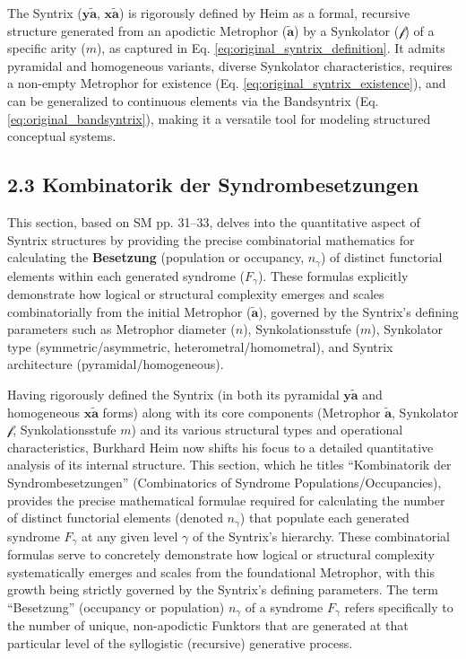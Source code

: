 \documentclass[12pt]{article}
\newcommand{\q}[1]{\enquote{#1}}
\newcommand{\syntrix}{\bm{y\widetilde{a}}}
\newcommand{\homogeneoussyntrix}{\bm{x\widetilde{a}}}
\newcommand{\metrophor}{\bm{\widetilde{a}}}
\newcommand{\synkolator}{\mathcal{f}}
\newcommand{\synkolationsstufe}{m}
\newcommand{\syndrom}{F} %
\begin{document}
The Syntrix (\(\syntrix\), \(\homogeneoussyntrix\)) is rigorously defined by Heim as a formal, recursive structure generated from an apodictic Metrophor (\(\metrophor\)) by a Synkolator (\(\synkolator\)) of a specific arity (\(\synkolationsstufe\)), as captured in Eq. \eqref{eq:original_syntrix_definition}. It admits pyramidal and homogeneous variants, diverse Synkolator characteristics, requires a non-empty Metrophor for existence (Eq. \eqref{eq:original_syntrix_existence}), and can be generalized to continuous elements via the Bandsyntrix (Eq. \eqref{eq:original_bandsyntrix}), making it a versatile tool for modeling structured conceptual systems.

\subsection{2.3 Kombinatorik der Syndrombesetzungen}
\label{sec:kombinatorik}

This section, based on SM pp. 31--33, delves into the quantitative aspect of Syntrix structures by providing the precise combinatorial mathematics for calculating the \textbf{Besetzung} (population or occupancy, \(n_\gamma\)) of distinct functorial elements within each generated syndrome (\(\syndrom_\gamma\)). These formulas explicitly demonstrate how logical or structural complexity emerges and scales combinatorially from the initial Metrophor (\(\metrophor\)), governed by the Syntrix's defining parameters such as Metrophor diameter (\(n\)), Synkolationsstufe (\(\synkolationsstufe\)), Synkolator type (symmetric/asymmetric, heterometral/homometral), and Syntrix architecture (pyramidal/homogeneous).

Having rigorously defined the Syntrix (in both its pyramidal \( \syntrix \) and homogeneous \( \homogeneoussyntrix \) forms) along with its core components (Metrophor \( \metrophor \), Synkolator \( \synkolator \), Synkolationsstufe \( \synkolationsstufe \)) and its various structural types and operational characteristics, Burkhard Heim now shifts his focus to a detailed quantitative analysis of its internal structure. This section, which he titles \q{Kombinatorik der Syndrombesetzungen} (Combinatorics of Syndrome Populations/Occupancies), provides the precise mathematical formulae required for calculating the number of distinct functorial elements (denoted \( n_\gamma \)) that populate each generated syndrome \( \syndrom_\gamma \) at any given level \( \gamma \) of the Syntrix's hierarchy. These combinatorial formulas serve to concretely demonstrate how logical or structural complexity systematically emerges and scales from the foundational Metrophor, with this growth being strictly governed by the Syntrix's defining parameters. The term \q{Besetzung} (occupancy or population) \( n_\gamma \) of a syndrome \( \syndrom_\gamma \) refers specifically to the number of unique, non-apodictic Funktors that are generated at that particular level of the syllogistic (recursive) generative process.
\end{document}
